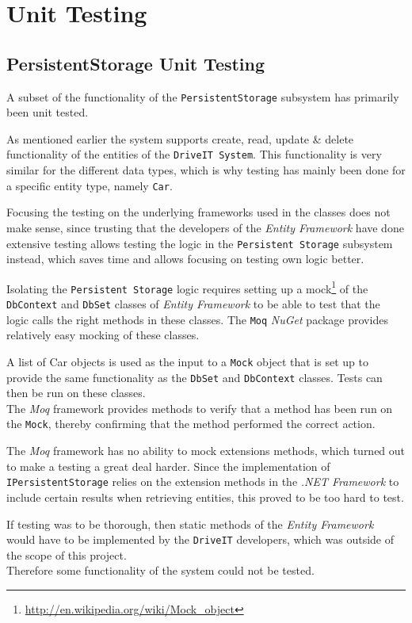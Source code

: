 \section{Unit Testing}
\subsection{PersistentStorage Unit Testing}
A subset of the functionality of the \texttt{PersistentStorage} subsystem has primarily been unit tested.

As mentioned earlier the system supports create, read, update \& delete functionality of the entities of the \texttt{DriveIT System}. This functionality is very similar for the different data types, which is why testing has mainly been done for a specific entity type, namely \texttt{Car}.

Focusing the testing on the underlying frameworks used in the classes does not make sense, since trusting that the developers of the \textit{Entity Framework} have done extensive testing allows testing the logic in the \texttt{Persistent Storage} subsystem instead, which saves time and allows focusing on testing own logic better.

Isolating the \texttt{Persistent Storage} logic requires setting up a mock\footnote{\url{http://en.wikipedia.org/wiki/Mock_object}} of the \texttt{DbContext} and \texttt{DbSet} classes of \textit{Entity Framework} to be able to test that the logic calls the right methods in these classes. The \texttt{Moq} \textit{NuGet} package provides relatively easy mocking of these classes. 

A list of Car objects is used as the input to a \texttt{Mock} object that is set up to provide the same functionality as the \texttt{DbSet} and \texttt{DbContext} classes. Tests can then be run on these classes.\\
The \textit{Moq} framework provides methods to verify that a method has been run on the \texttt{Mock}, thereby confirming that the method performed the correct action. 

The \textit{Moq} framework has no ability to mock extensions methods, which turned out to make a testing a great deal harder. Since the implementation of \texttt{IPersistentStorage} relies on the extension methods in the \textit{.NET Framework} to include certain results when retrieving entities, this proved to be too hard to test. 

If testing was to be thorough, then static methods of the \textit{Entity Framework} would have to be implemented by the \texttt{DriveIT} developers, which was outside of the scope of this project. \\Therefore some functionality of the system could not be tested.


